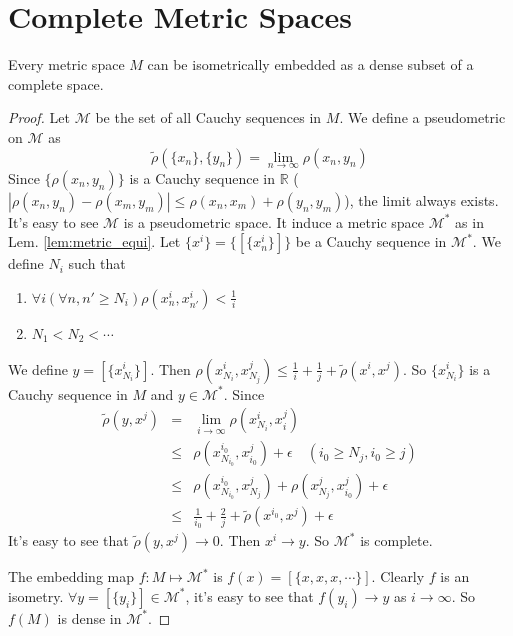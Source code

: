 \documentclass[12pt]{book}
\begin{document}
\section{Complete Metric Spaces}
\begin{theorem}
	Every metric space $M$ can be isometrically embedded as a dense subset of a complete space.
\end{theorem}
\begin{proof}
	Let $\mathcal M$ be the set of all Cauchy sequences in $M$. We define a pseudometric on $\mathcal M$ as
	\begin{equation}
		\tilde\rho(\{x_n\},\{y_n\})=\lim_{n\rightarrow\infty}\rho(x_n,y_n)
	\end{equation}
	Since $\{\rho(x_n,y_n)\}$ is a Cauchy sequence in $\mathbb R$ ($|\rho(x_n,y_n)-\rho(x_m,y_m)|\leq\rho(x_n,x_m)+\rho(y_n,y_m)$), the limit always exists. It's easy to see $\mathcal M$ is a pseudometric space. It induce a metric space $\mathcal M^*$ as in Lem. \ref{lem:metric_equi}. Let $\{x^i\}=\{[\{x^i_n\}]\}$ be a Cauchy sequence in $\mathcal M^*$. We define $N_i$ such that 
	\begin{enumerate}
		\item $\forall i(\forall n,n'\geq N_i)\rho(x_n^i,x_{n'}^i)<\frac 1i$
		\item $N_1<N_2<\cdots$
	\end{enumerate}
	
	We define $y=[\{x^i_{N_{i}}\}]$. Then $\rho(x^i_{N_{i}},x^j_{N_{j}})\leq \frac 1i+\frac 1j+\tilde\rho(x^i,x^j)$. So $\{x^i_{N_{i}}\}$ is a Cauchy sequence in $M$ and $y\in \mathcal M^*$. Since
	\begin{eqnarray}
		\tilde\rho(y,x^j)&=&\lim_{i\rightarrow\infty}\rho(x^i_{N_{i}},x^j_i)\\
		&\leq& \rho(x^{i_0}_{N_{i_0}},x^j_{i_0})+\epsilon\quad (i_0\geq N_j,i_0\geq j)\\
		&\leq&\rho(x^{i_0}_{N_{i_0}},x^j_{N_{j}})+\rho(x^j_{N_{j}},x^j_{i_0})+\epsilon\\
		&\leq&\frac 1{i_0}+\frac 2j+\tilde\rho(x^{i_0},x^j)+\epsilon
	\end{eqnarray}
	It's easy to see that $\tilde\rho(y,x^j)\rightarrow 0$. Then $x^i\rightarrow y$. So $\mathcal M^*$ is complete.
	
	The embedding map $f:M\mapsto \mathcal M^*$ is $f(x)=[\{x,x,x,\cdots\}]$. Clearly $f$ is an isometry. $\forall y=[\{y_i\}]\in \mathcal M^*$, it's easy to see that $f(y_i)\rightarrow y$ as $i\rightarrow \infty $. So $f(M)$ is dense in $\mathcal M^*$.

\end{proof}
\end{document}
